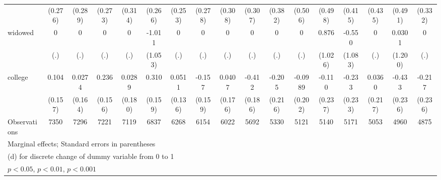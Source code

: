 {\begin{tabular}{l*{16}{c}}
                    &     (0.276)         &     (0.289)         &     (0.273)         &     (0.314)         &     (0.266)         &     (0.253)         &     (0.278)         &     (0.308)         &     (0.307)         &     (0.382)         &     (0.506)         &     (0.498)         &     (0.415)         &     (0.435)         &     (0.491)         &     (0.332)         \\
[1em]
widowed             &           0         &           0         &           0         &           0         &      -1.011         &           0         &           0         &           0         &           0         &           0         &           0         &       0.876         &      -0.550         &           0         &      0.0301         &           0         \\
                    &         (.)         &         (.)         &         (.)         &         (.)         &     (1.053)         &         (.)         &         (.)         &         (.)         &         (.)         &         (.)         &         (.)         &     (1.026)         &     (1.083)         &         (.)         &     (1.200)         &         (.)         \\
[1em]
college             &       0.104         &      0.0274         &       0.236         &      0.0289         &       0.310         &      0.0511         &      -0.157         &      0.0407         &      -0.412\sym{*}  &      -0.205         &     -0.0989         &      -0.110         &      -0.233         &      0.0360         &      -0.433         &      -0.217         \\
                    &     (0.157)         &     (0.164)         &     (0.156)         &     (0.180)         &     (0.159)         &     (0.136)         &     (0.159)         &     (0.176)         &     (0.186)         &     (0.216)         &     (0.202)         &     (0.237)         &     (0.233)         &     (0.217)         &     (0.236)         &     (0.236)         \\
\hline
Observations        &        7350         &        7296         &        7221         &        7119         &        6837         &        6268         &        6154         &        6022         &        5692         &        5330         &        5121         &        5140         &        5171         &        5053         &        4960         &        4875         \\
\hline\hline
\multicolumn{17}{l}{\footnotesize Marginal effects; Standard errors in parentheses}\\
\multicolumn{17}{l}{\footnotesize  (d) for discrete change of dummy variable from 0 to 1}\\
\multicolumn{17}{l}{\footnotesize \sym{*} \(p<0.05\), \sym{**} \(p<0.01\), \sym{***} \(p<0.001\)}\\
\end{tabular}
}
